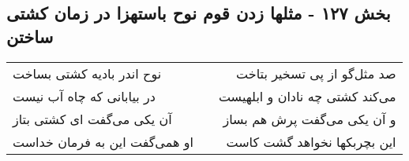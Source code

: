 \begin{center}
\section*{بخش ۱۲۷ - مثلها زدن قوم نوح باستهزا در زمان کشتی ساختن}
\label{sec:sh127}
\begin{longtable}{l p{0.5cm} r}
نوح اندر بادیه کشتی بساخت
&&
صد مثل‌گو از پی تسخیر بتاخت
\\
در بیابانی که چاه آب نیست
&&
می‌کند کشتی چه نادان و ابلهیست
\\
آن یکی می‌گفت ای کشتی بتاز
&&
و آن یکی می‌گفت پرش هم بساز
\\
او همی‌گفت این به فرمان خداست
&&
این بچربکها نخواهد گشت کاست
\\
\end{longtable}
\end{center}
